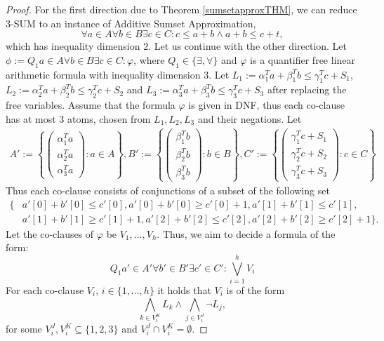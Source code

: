 \begin{proof}
  For the first direction due to Theorem \ref{sumsetapproxTHM}, we can reduce $3$-SUM to an instance of Additive Sumset Approximation,
  $$ \forall a \in A \forall b \in B \exists c \in C: c \leq a+b \land a+b \leq c+t,$$
  which has inequality dimension 2. Let us continue with the other direction.
  Let $\phi:=Q_1 a \in A \forall b \in B \exists c \in C: \varphi$, where $Q_1 \in \{\exists,\forall \}$ and $\varphi$ is a quantifier free linear arithmetic formula with inequality dimension $3$.
  Let $L_1:=\alpha_{1}^T a + \beta_{1}^T b \leq \gamma_{1}^T c +S_{1}$,
   $L_2:= \alpha_{2}^T a + \beta_{2}^T b \leq \gamma_{2}^T c +S_{2}$ and
   $L_3:= \alpha_{3}^T a + \beta_{3}^T b \leq \gamma_{3}^T c +S_{3}$ after replacing the free variables.
  Assume that the formula $\varphi$ is given in DNF, thus each co-clause
  has at most $3$ atoms, chosen from $L_1,L_2,L_3$ and their negations. 
  Let 
  \begin{align*}
   A':= \left \{ \left( \begin{array}{cc}
    \alpha_{1}^T a \\
    \alpha_{2}^T a \\
    \alpha_{3}^T a
    \end{array}  \right): a \in A \right \},
    B':=\left \{ \left( \begin{array}{cc}
      \beta_{1}^T b \\
      \beta_{2}^T b \\
      \beta_{3}^T b 
      \end{array}  \right):b \in B \right \},
      C':=\left \{ \left( \begin{array}{cc}
        \gamma_{1}^T c +S_{1} \\
        \gamma_{2}^T c +S_{2}\\
        \gamma_{3}^T c+ S_{3}
        \end{array}  \right):c \in C \right \}
  \end{align*}
  Thus each co-clause consists of conjunctions of a subset of the following set
  \begin{align*}
    \{ & a'[0]+b'[0] \leq c'[0] ,a'[0]+b'[0] \geq c'[0]+1, 
                    a'[1]+b'[1] \leq c'[1], \\
                   & a'[1]+b'[1] \geq  c'[1]+1, 
                    a'[2]+b'[2] \leq c'[2], a'[2] +b'[2] \geq c'[2] +1
    \}.
  \end{align*}
  Let the co-clauses of $\varphi$ be $V_1, \dots ,V_h$. Thus, we aim to decide a formula of the form:
  \begin{equation}\label{eq:Dnfcurr}
  Q_1 a' \in A' \forall b' \in B' \exists c' \in C': \bigvee_{i=1}^{h} V_{i} 
  \end{equation} 
  For each co-clause $V_i$, $i \in \{1,\dots,h\} $ it holds that $V_i$ is of the form
  $$ \bigwedge_{k \in V_i^K} L_k  \land \bigwedge_{j \in V_i^J} \lnot L_j,$$
  for some $V_i^J,V_i^K \subseteq \{1,2,3\}$ and $V_i^J\cap V_i^K =\emptyset$. 


\end{proof}
